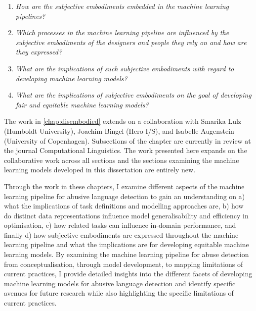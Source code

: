 {\begin{center}
\begin{minipage}{0.9\textwidth}
\vspace{5mm}
    \begin{enumerate}[start=10, label={\textbf{RQ \arabic*}}]
        \item{\textit{How are the subjective embodiments embedded in the machine learning pipelines?}}
        \item{\textit{Which processes in the machine learning pipeline are influenced by the subjective embodiments of the designers and people they rely on and how are they expressed?}}
        \item{\textit{What are the implications of such subjective embodiments with regard to developing machine learning models?}}
        \item{\textit{What are the implications of subjective embodiments on the goal of developing fair and equitable machine learning models?}}
    \end{enumerate}
\vspace{5mm}
\end{minipage}
\end{center}

The work in \cref{chap:disembodied} extends on a collaboration with Smarika Lulz (Humboldt University), Joachim Bingel (Hero I/S), and Isabelle Augenstein (University of Copenhagen). Subsections of the chapter are currently in review at the journal Computational Linguistics.
The work presented here expands on the collaborative work across all sections and the sections examining the machine learning models developed in this dissertation are entirely new.

Through the work in these chapters, I examine different aspects of the machine learning pipeline for abusive language detection to gain an understanding on a) what the implications of task definitions and modelling approaches are, b) how do distinct data representations influence model generalisability and efficiency in optimisation, c) how related tasks can influence in-domain performance, and finally d) how subjective embodiments are expressed throughout the machine learning pipeline and what the implications are for developing equitable machine learning models.
By examining the machine learning pipeline for abuse detection from conceptualisation, through model development, to mapping limitations of current practices, I provide detailed insights into the different facets of developing machine learning models for abusive language detection and identify specific avenues for future research while also highlighting the specific limitations of current practices.

}
